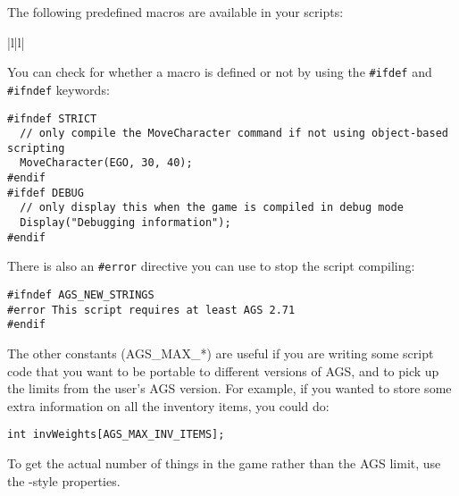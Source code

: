 The following predefined macros are available in your scripts:

\begin{tabular}{|l|l|}
\end{tabular}

You can check for whether a macro is defined or not by using the \verb$#ifdef$ and
\verb$#ifndef$ keywords:
\begin{verbatim}
#ifndef STRICT
  // only compile the MoveCharacter command if not using object-based scripting
  MoveCharacter(EGO, 30, 40);
#endif
#ifdef DEBUG
  // only display this when the game is compiled in debug mode
  Display("Debugging information");
#endif
\end{verbatim}
There is also an \verb$#error$ directive you can use to stop the script compiling:
\begin{verbatim}
#ifndef AGS_NEW_STRINGS
#error This script requires at least AGS 2.71
#endif
\end{verbatim}

The other constants (AGS_MAX_*) are useful if you are writing some script code that you
want to be portable to different versions of AGS, and to pick up the limits from the user's
AGS version. For example, if you wanted to store some extra information on all the inventory
items, you could do:
\begin{verbatim}
int invWeights[AGS_MAX_INV_ITEMS];
\end{verbatim}
To get the actual number of things in the game rather than the AGS limit, use the
-style properties.


